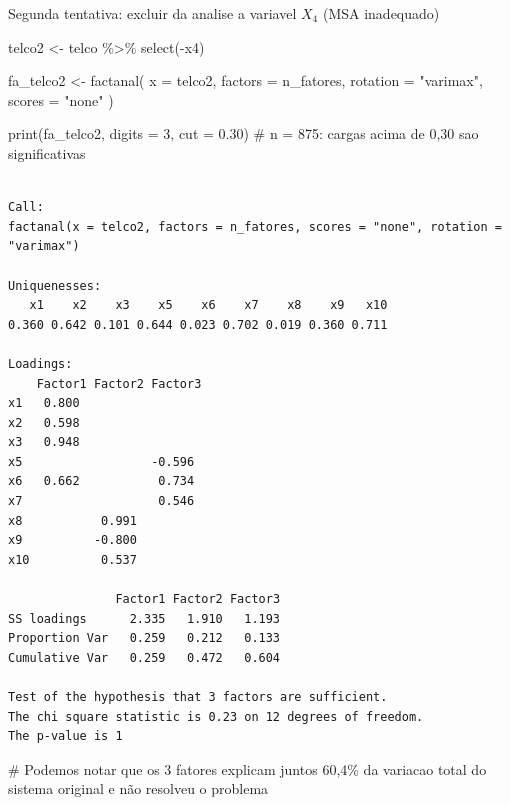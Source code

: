 \documentclass[
  ignorenonframetext,
  aspectratio=169,
]{beamer}
\newenvironment{Shaded}{\begin{snugshade}}{\end{snugshade}}
\newcommand{\AttributeTok}[1]{\textcolor[rgb]{0.40,0.45,0.13}{#1}}
\newcommand{\CommentTok}[1]{\textcolor[rgb]{0.37,0.37,0.37}{#1}}
\newcommand{\DecValTok}[1]{\textcolor[rgb]{0.68,0.00,0.00}{#1}}
\newcommand{\FloatTok}[1]{\textcolor[rgb]{0.68,0.00,0.00}{#1}}
\newcommand{\FunctionTok}[1]{\textcolor[rgb]{0.28,0.35,0.67}{#1}}
\newcommand{\NormalTok}[1]{\textcolor[rgb]{0.00,0.23,0.31}{#1}}
\newcommand{\OtherTok}[1]{\textcolor[rgb]{0.00,0.23,0.31}{#1}}
\newcommand{\SpecialCharTok}[1]{\textcolor[rgb]{0.37,0.37,0.37}{#1}}
\newcommand{\StringTok}[1]{\textcolor[rgb]{0.13,0.47,0.30}{#1}}
\begin{document}
\begin{frame}[fragile]{Segunda tentativa: excluir da analise a variavel
\(X_4\) (MSA inadequado)}
\label{segunda-tentativa-excluir-da-analise-a-variavel-x_4-msa-inadequado}
\begin{Shaded}
\begin{Highlighting}[]
\NormalTok{telco2 }\OtherTok{\textless{}{-}}\NormalTok{ telco }\SpecialCharTok{\%\textgreater{}\%} \FunctionTok{select}\NormalTok{(}\SpecialCharTok{{-}}\NormalTok{x4)}

\NormalTok{fa\_telco2 }\OtherTok{\textless{}{-}} \FunctionTok{factanal}\NormalTok{(}
  \AttributeTok{x        =}\NormalTok{ telco2,}
  \AttributeTok{factors  =}\NormalTok{ n\_fatores,}
  \AttributeTok{rotation =} \StringTok{"varimax"}\NormalTok{,}
  \AttributeTok{scores   =} \StringTok{"none"}
\NormalTok{)}

\FunctionTok{print}\NormalTok{(fa\_telco2, }\AttributeTok{digits =} \DecValTok{3}\NormalTok{, }\AttributeTok{cut =} \FloatTok{0.30}\NormalTok{) }\CommentTok{\# n = 875: cargas acima de 0,30 sao significativas}
\end{Highlighting}
\end{Shaded}

\begin{verbatim}

Call:
factanal(x = telco2, factors = n_fatores, scores = "none", rotation = "varimax")

Uniquenesses:
   x1    x2    x3    x5    x6    x7    x8    x9   x10 
0.360 0.642 0.101 0.644 0.023 0.702 0.019 0.360 0.711 

Loadings:
    Factor1 Factor2 Factor3
x1   0.800                 
x2   0.598                 
x3   0.948                 
x5                  -0.596 
x6   0.662           0.734 
x7                   0.546 
x8           0.991         
x9          -0.800         
x10          0.537         

               Factor1 Factor2 Factor3
SS loadings      2.335   1.910   1.193
Proportion Var   0.259   0.212   0.133
Cumulative Var   0.259   0.472   0.604

Test of the hypothesis that 3 factors are sufficient.
The chi square statistic is 0.23 on 12 degrees of freedom.
The p-value is 1 
\end{verbatim}

\begin{Shaded}
\begin{Highlighting}[]
\CommentTok{\# Podemos notar que os 3 fatores explicam juntos 60,4\% da variacao total do sistema original e não resolveu o problema}
\end{Highlighting}
\end{Shaded}
\end{frame}
\end{document}
